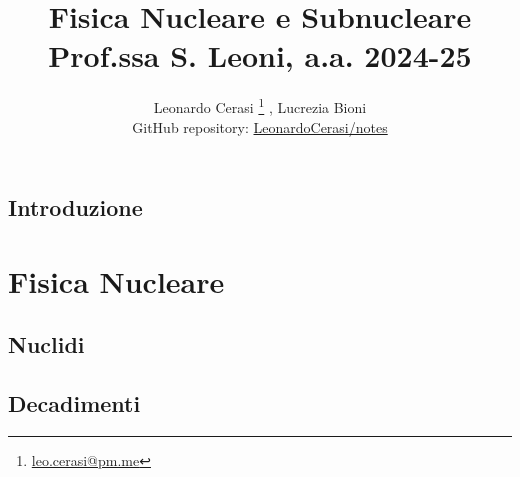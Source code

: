 \documentclass[a4paper, 12pt, openany]{book}
\author{Leonardo Cerasi%
	\thanks{\scriptsize\href{mailto:leonardo.cerasi@studenti.unimi.it}{leo.cerasi@pm.me}}%
	, Lucrezia Bioni\\
	\small GitHub repository: \href{https://github.com/LeonardoCerasi/notes}{LeonardoCerasi/notes}}
\title{\Huge\textbf{Fisica Nucleare e Subnucleare} \\ \large Prof.ssa S. Leoni, a.a. 2024-25}
\begin{document}
\frontmatter

\maketitle
\tableofcontents
\pagestyle{indice}

\mainmatter

\chapter*{Introduzione}

\pagestyle{introd}

\part{Fisica Nucleare}

\chapter{Nuclidi}


\chapter{Decadimenti}

\end{document}
